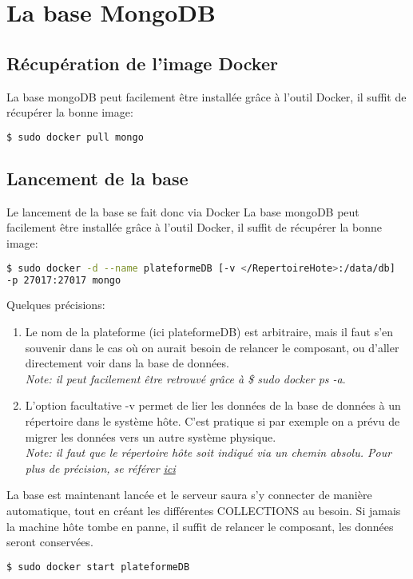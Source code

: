 \documentclass[a4paper]{article}
\begin{document}
\section{La base MongoDB}
\subsection{Récupération de l'image Docker}
La base mongoDB peut facilement être installée grâce à l'outil Docker, il suffit de récupérer la bonne image:
\begin{lstlisting}[language=bash]
  $ sudo docker pull mongo
\end{lstlisting}
\subsection{Lancement de la base}
Le lancement de la base se fait donc via Docker
La base mongoDB peut facilement être installée grâce à l'outil Docker, il suffit de récupérer la bonne image:
\begin{lstlisting}[language=bash]
$ sudo docker -d --name plateformeDB [-v </RepertoireHote>:/data/db] 
-p 27017:27017 mongo
\end{lstlisting}
Quelques précisions:
\begin{enumerate}
\item Le nom de la plateforme (ici plateformeDB) est arbitraire, mais il faut s'en souvenir dans le cas où on aurait besoin de relancer le composant, ou d'aller directement voir dans la base de données. \\
\textit{Note: il peut facilement être retrouvé grâce à \$ sudo docker ps -a}.
\item L'option facultative -v permet de lier les données de la base de données à un répertoire dans le système hôte. C'est pratique si par exemple on a prévu de migrer les données vers un autre système physique.\\
\textit{Note: il faut que le répertoire hôte soit indiqué via un chemin absolu. Pour plus de précision, se référer \href{https://docs.docker.com/engine/reference/commandline/run/\#/mount-volume--v---read-only}{ici}}
\end{enumerate}
La base est maintenant lancée et le serveur saura s'y connecter de manière automatique, tout en créant les différentes COLLECTIONS au besoin. Si jamais la machine hôte tombe en panne, il suffit de relancer le composant, les données seront conservées.
\begin{lstlisting}[language=bash]
  $ sudo docker start plateformeDB
\end{lstlisting}
\end{document}
